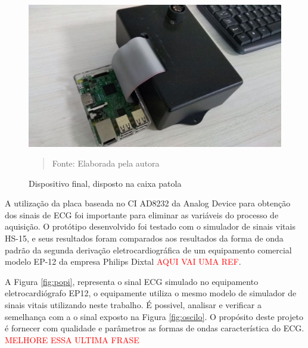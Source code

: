 \documentclass[12pt, a4paper]{article}
\begin{document}
\begin{figure}[H]
\begin{center}
			\caption{Dispositivo final, disposto na caixa patola}
			\includegraphics[width=.9\textwidth]{Figuras/IMG_3651.jpg}
              \vspace*{\fill} 
            \begin{quote} 
            \centering 
           Fonte: Elaborada pela autora
            \end{quote}
            \vspace*{\fill}
			
			\label{fig:mama}
\end{center}
\end{figure}
A utilização da placa baseada no CI AD8232 da Analog Device para obtenção dos sinais de ECG foi importante para eliminar as variáveis do processo de aquisição. O protótipo desenvolvido foi testado com o simulador de sinais vitais HS-15, e seus resultados foram comparados aos resultados da forma de onda padrão da segunda derivação eletrocardiográfica de um equipamento comercial modelo EP-12 da empresa Philips Dixtal \textcolor{red}{AQUI VAI UMA REF}.

A Figura \ref{fig:popi}, representa o sinal ECG simulado no equipamento eletrocardiógrafo EP12, o equipamente utiliza o mesmo modelo de simulador de sinais vitais utilizando neste trabalho. É possivel, analisar e verificar a semelhança com a o sinal exposto na Figura  \ref{fig:oscilo}.  O propósito deste projeto é fornecer com qualidade e parâmetros as formas de ondas característica do ECG. \textcolor{red}{MELHORE ESSA ULTIMA FRASE}
\end{document}
